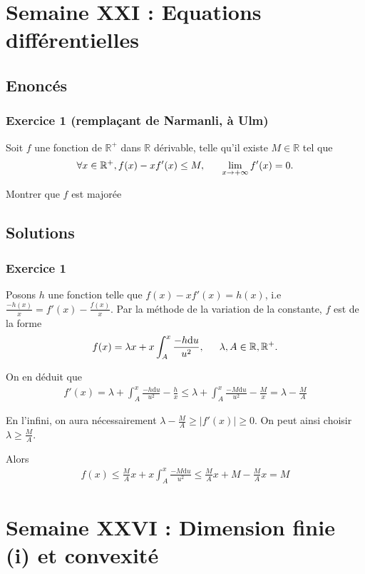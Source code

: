 \documentclass{article}
\begin{document}
\section{Semaine XXI : Equations différentielles}
\subsection*{Enoncés}
\subsubsection*{Exercice 1 (remplaçant de Narmanli, à Ulm)}
Soit $f$ une fonction de $\mathbb{R}^+$ dans $\mathbb{R}$ dérivable, telle qu'il existe $M \in \mathbb{R}$ tel que
\begin{align*}
\forall x\in\mathbb{R}^+, f(x)-xf'(x) \leq M, \indent \lim_{x\to +\infty}f'(x) =  0.
\end{align*} 

Montrer que $f$ est majorée
\subsection*{Solutions}
\subsubsection*{Exercice 1}
Posons $h$ une fonction telle que $f(x)-xf'(x)=h(x)$, i.e $\frac{-h(x)}{x}=f'(x)-\frac{f(x)}{x}$. Par la méthode de la variation de la constante, $f$ est de la forme
\begin{align*}
f(x)=\lambda x + x\int_{A}^{x}{\frac{-h\mathrm{d}u}{u^2}},\indent \lambda, A\in\mathbb{R}, \mathbb{R}^+.
\end{align*}

On en déduit que 
\begin{align*}
f'(x) = \lambda+\int_{A}^{x}{\frac{-h\mathrm{d}u}{u^2}}-\frac{h}{x}\leq \lambda+\int_{A}^{x}{\frac{-M\mathrm{d}u}{u^2}}-\frac{M}{x}=\lambda-\frac{M}{A}
\end{align*} 

En l'infini, on aura nécessairement $\lambda-\frac{M}{A}\geq |f'(x)|\geq 0$. On peut ainsi choisir $\lambda \geq \frac{M}{A}$.

Alors 
\begin{align*}
f(x)\leq \frac{M}{A}x+x\int_{A}^{x}{\frac{-M\mathrm{d}u}{u^2}}\leq \frac{M}{A}x+M-\frac{M}{A}x=M
\end{align*}

\section{Semaine XXVI : Dimension finie (i) et convexité}
\end{document}
